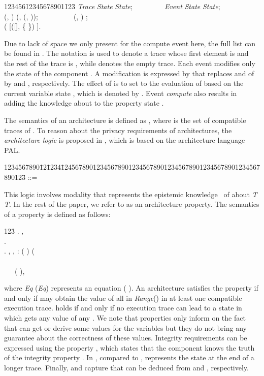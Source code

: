 \documentclass{llncs}
\begin{document}
\small
\begin{tabbing}
    123456\=12345678901\=123\= \kill
     \>   \textit{Trace}  \textit{State}  \textit{State};\ \ \ \ \ \ \ \ \   \textit{Event}  \textit{State}  \textit{State};\\
    \>  (, )   (, (, ));\ \ \ \ \ \ \ \ \ \    
     (, )   ;\\ 
    \>  (   [([],
      \{  \})   ].
\end{tabbing}
\normalsize 
 
Due to lack of space we only present  for the compute event here, 
the full list can be found in \cite{TM-STM2014}. The notation  is used to 
denote a trace whose first element is  and the rest of the trace is , while 
 denotes the empty trace. Each 
event modifies only the state  of the component . A modification is expressed by 
 that replaces  and  of  by  
and , respectively. 
The effect of  is to set  to the evaluation of 
 based on the current variable state , which is denoted by 
. Event \textit{compute} also results in adding the knowledge 
about  to the property state . 
 
The semantics of an architecture  is defined as  
, where  is the set of compatible traces of .   
To reason about the privacy requirements of architectures, the \textit{architecture logic} is proposed in \cite{TM-STM2014}, which is based on the architecture language PAL.

\small
\begin{tabbing}
    1234567890\=12\=1234\=12456789012345678901234567890123456789012345678901234567890123\= \kill
    \>  \> ::= \>        
\end{tabbing}
\normalsize


This logic involves modality  that represents the epistemic knowledge~\cite{fagin:2004} 
of  about \textit{T}  \textit{T}. In the rest of the paper, we 
refer to  as an architecture property. 
The semantics  of a property  is defined as follows: 
\small
\begin{tabbing}
    123\=\kill
    .        ,  \\
    .          \\ 
    .         ,    ,  : (  )  (  \\ 
    \>\ \ \ \ \ \ \ \ \ \ \ \ \ \ \ \ \ \ \ \ \ \ \ \ \ \ \ \ \ \ \ \ \ \ \ \ \ \ \ \ \ \ \ \ \ \ \ \ \ \ \ \ \ \ \ \ \ \ \ \ \ \ \ \ \ \ \ \ \ \ \ \ \ \ \  (  ), 
\end{tabbing}
\normalsize

\noindent where \textit{Eq} (\textit{Eq}) represents an equation    (  ). 
An architecture satisfies the  property if and only if  may 
obtain the value of all  in \textit{Range}() in at least one compatible execution trace. 
 holds if and only if no execution trace can lead to a 
state in which  gets any value of any . We note that  properties 
only inform on the fact that  can get or derive some values for the variables but they 
do not bring any guarantee about the correctness of  these values. Integrity requirements 
can be expressed using the property , which states that 
the component  knows the truth of the integrity property 
. 
In , compared to ,  represents the 
state at the end of a longer trace.
Finally,    and  
  capture that  can be 
deduced from   and , respectively.  
\end{document}

